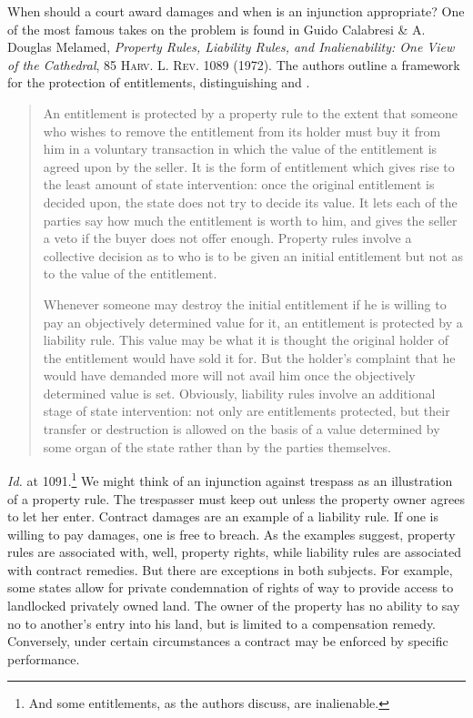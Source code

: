 
When should a court award damages and when is an injunction appropriate? One of
the most famous takes on the problem is found in Guido Calabresi \& A. Douglas
Melamed, \textit{Property Rules, Liability Rules, and Inalienability: One View
of the Cathedral}, 85 \textsc{Harv. L. Rev.} 1089 (1972). The authors outline a
framework for the protection of entitlements, distinguishing  and
. 
\begin{quotation}
An entitlement is protected by a property rule to the extent that someone who
wishes to remove the entitlement from its holder must buy it from him in a
voluntary transaction in which the value of the entitlement is agreed upon by
the seller. It is the form of entitlement which gives rise to the least amount
of state intervention: once the original entitlement is decided upon, the state
does not try to decide its value. It lets each of the parties say how much the
entitlement is worth to him, and gives the seller a veto if the buyer does not
offer enough. Property rules involve a collective decision as to who is to be
given an initial entitlement but not as to the value of the entitlement.

Whenever someone may destroy the initial entitlement if he is willing to pay an
objectively determined value for it, an entitlement is protected by a liability
rule. This value may be what it is thought the original holder of the
entitlement would have sold it for. But the holder's complaint that he would
have demanded more will not avail him once the objectively determined value is
set. Obviously, liability rules involve an additional stage of state
intervention: not only are entitlements protected, but their transfer or
destruction is allowed on the basis of a value determined by some organ of the
state rather than by the parties themselves.
\end{quotation}
\textit{Id.} at 1091.\footnote{And some entitlements, as the authors discuss,
are inalienable.} We might think of an injunction against trespass as an
illustration of a property rule. The trespasser must keep out unless the
property owner agrees to let her enter. Contract damages are an example of a
liability rule. If one is willing to pay damages, one is free to breach. As the
examples suggest, property rules are associated with, well, property rights,
while liability rules are associated with contract remedies. But there are
exceptions in both subjects. For example, some states allow for private
condemnation of rights of way to provide access to landlocked privately owned
land. The owner of the property has no ability to say no to another's entry into
his land, but is limited to a compensation remedy. Conversely, under certain
circumstances a contract may be enforced by specific performance.

